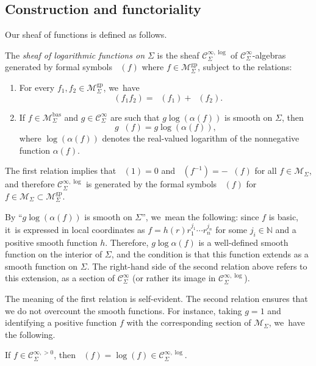 \documentclass[JEP,XML,SOM,Unicode,NoFloatCountersInSection,published]{cedram}
\theoremstyle{definition}
\theoremstyle{remark}
\newenvironment{remark}
  {\pushQED{\qed}\renewcommand{\qedsymbol}{$\lozenge$}\remarkx}
  {\popQED\endremarkx}
\let\defn\emph
\newcommand{\NN}{\mathbb{N}}
\newcommand{\ulog}{\mathop{\widetilde{\log}}\nolimits}
\newcommand{\cM}{\mathscr{M}}
\newcommand{\cMgp}{\mathscr{M}^{\mathrm{gp}}}
\newcommand{\cMbas}{\mathscr{M}^{\mathrm{bas}}}
\newcommand{\Cinf}[1]{\mathscr{C}^{\infty}_{#1}}
\newcommand{\Cinfpos}[1]{\mathscr{C}^{\infty, > 0}_{#1}}
\newcommand{\Cinflog}[1]{\mathscr{C}^{\infty,\log}_{#1}}
\newcommand{\Sig}{\Sigma}
\begin{document}
\subsection{Construction and functoriality} Our sheaf of functions is defined as follows.
\begin{definition}\label{def:log-functions}
The \defn{sheaf of logarithmic functions on $\Sig$} is the sheaf $\Cinflog{\Sig}$ of $\Cinf{\Sig}$-algebras generated by formal symbols $\ulog(f)$ where $f \in \cMgp_\Sig$, subject to the relations:
\begin{enumerate}
\item For every $f_1,f_2 \in \cMgp_\Sig$, we~have
\[
\ulog(f_1f_2) = \ulog(f_1)+\ulog(f_2).
\]
\item If $f \in \cMbas_\Sig$ and $g \in \Cinf{\Sig}$ are such that $g\log(\alpha(f))$ is smooth on $\Sig$, then
\[
g\ulog(f) = g\log(\alpha(f)),
\]
where $\log(\alpha(f))$ denotes the real-valued logarithm of the nonnegative function $\alpha(f)$.
\end{enumerate}
\end{definition}

\begin{remark}
The first relation implies that $\ulog(1)=0$ and $\ulog(f^{-1})=-\ulog(f)$ for all $f\in\cM_\Sig$, and therefore $\Cinflog{\Sig}$ is generated by the formal symbols $\ulog(f)$ for $f\in \cM_\Sig\subset \cMgp_\Sig$.
\end{remark}

\begin{remark}
By ``$g\log(\alpha(f))$ is smooth on $\Sig$'', we~mean the following: since $f$ is basic, it~is expressed in local coordinates as $f=h(r)r_1^{j_1}\cdots r_n^{j_n}$ for some $j_i\in\NN$ and a positive smooth function $h$. Therefore, $g\log \alpha(f)$ is a well-defined smooth function on the interior of $\Sig$, and the condition is that this function extends as a smooth function on $\Sig$. The right-hand side of the second relation above refers to this extension, as a section of $\Cinf{\Sig}$ (or rather its image in $\Cinflog{\Sig}$).
\end{remark}

The meaning of the first relation is self-evident. The second relation ensures that we do not overcount the smooth functions. For instance, taking $g=1$ and identifying a positive function $f$ with the corresponding section of $\cM_\Sig$, we~have the following.

\begin{lemma}\label{lem:formal-vs-actual-log}
If $f \in \Cinfpos{\Sig}$, then $\ulog(f) = \log(f) \in \Cinflog{\Sig}$.
\end{lemma}
\end{document}
